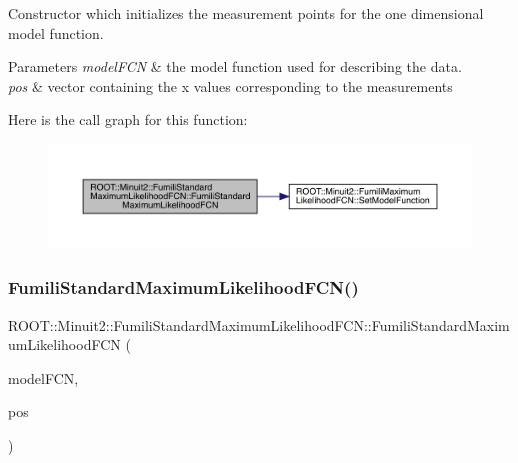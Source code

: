 Constructor which initializes the measurement points for the one dimensional model function.


\begin{DoxyParams}{Parameters}
{\em model\+F\+CN} & the model function used for describing the data.\\
\hline
{\em pos} & vector containing the x values corresponding to the measurements \\
\hline
\end{DoxyParams}
Here is the call graph for this function\+:
\nopagebreak
\begin{figure}[H]
\begin{center}
\leavevmode
\includegraphics[width=350pt]{dd/d40/classROOT_1_1Minuit2_1_1FumiliStandardMaximumLikelihoodFCN_af7dc80571b509a0a4f2f7ef821c3b1e6_cgraph}
\end{center}
\end{figure}
\mbox{\label{classROOT_1_1Minuit2_1_1FumiliStandardMaximumLikelihoodFCN_af233ad0d9ef029dd8aa6a145ea991483}} 
\subsubsection{\texorpdfstring{FumiliStandardMaximumLikelihoodFCN()}{FumiliStandardMaximumLikelihoodFCN()}\hspace{0.1cm}{\footnotesize\ttfamily [2/6]}}
{\footnotesize\ttfamily R\+O\+O\+T\+::\+Minuit2\+::\+Fumili\+Standard\+Maximum\+Likelihood\+F\+C\+N\+::\+Fumili\+Standard\+Maximum\+Likelihood\+F\+CN (\begin{DoxyParamCaption}\item[{const \mbox{\hyperlink{classROOT_1_1Minuit2_1_1ParametricFunction}{Parametric\+Function}} \&}]{model\+F\+CN,  }\item[{const std\+::vector$<$ std\+::vector$<$ double $>$ $>$ \&}]{pos }\end{DoxyParamCaption})\hspace{0.3cm}{\ttfamily [inline]}}

